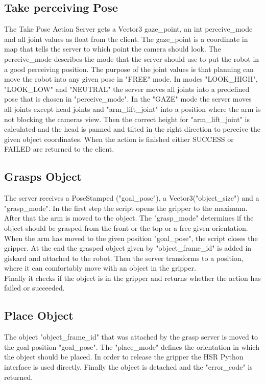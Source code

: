 \documentclass[main.tex]{subfiles}
\begin{document}
	\subsection{Take perceiving Pose}
	The Take Pose Action Server gets a Vector3 gaze\_point, an int perceive\_mode and all joint values as float from the client. The gaze\_point is a coordinate in map that tells the server to which point the camera should look. The perceive\_mode describes the mode that the server should use to put the robot in a good perceiving position. The purpose of the joint values is that planning can move the robot into any given pose in "FREE" mode. In modes "LOOK\_HIGH", "LOOK\_LOW" and "NEUTRAL" the server moves all joints into a predefined pose that is chosen in "perceive\_mode". In the "GAZE" mode the server moves all joints except head joints and "arm\_lift\_joint" into a position where the arm is not blocking the cameras view. Then the correct height for "arm\_lift\_joint" is calculated and the head is panned and tilted in the right direction to perceive the given object coordinates. When the action is finished either SUCCESS or FAILED are returned to the client.

	\vspace{1cm}
	
	\subsection{Grasps Object}
	The server receives a PoseStamped ("goal\_pose"), a Vector3("object\_size") and a "grasp\_mode". In the first step the script opens the gripper to the maximum. After that the arm is moved to the object. The "grasp\_mode" determines if the object should be grasped from the front or the top or a free given orientation. When the arm has moved to the given position "goal\_pose", the script closes the gripper. At the end the grasped object given by "object\_frame\_id" is added in giskard and attached to the robot. Then the server transforms to a position, where it can comfortably move with an object in the gripper.\\
	Finally it checks if the object is in the gripper and returns whether the action has failed or succeeded.
	
	\vspace{1cm}
	
	\subsection{Place Object}
	The object "object\_frame\_id" that was attached by the grasp server is moved to the goal position "goal\_pose". The "place\_mode" defines the orientation in which the object should be placed. In order to release the gripper the HSR Python interface is used directly. Finally the object is detached and the "error\_code" is returned.
	
\end{document}
